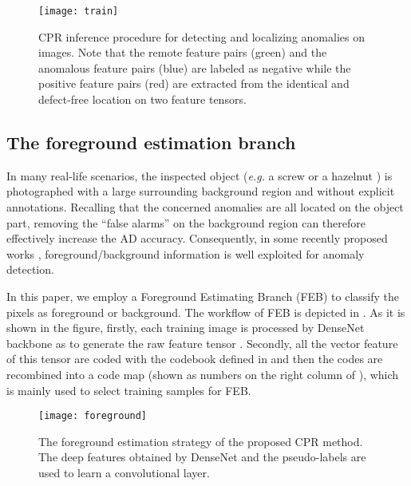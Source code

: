 \documentclass[lettersize,journal]{IEEEtran}
\begin{document}
\begin{figure*}[htbp]
  \centering
  \texttt{[image: train]}
  \caption{
    CPR inference procedure for detecting and localizing anomalies on images. Note that
    the remote feature pairs (green) and the anomalous feature pairs (blue) are labeled as
    negative while the positive feature pairs (red) are extracted from the identical and
    defect-free location on two feature tensors.}
  \label{fig:train}
\end{figure*}

\subsection{The foreground estimation branch}
\label{subsec:foreground}
In many real-life scenarios, the inspected object (\emph{e.g.} a screw or a hazelnut
\cite{bergmann2019mvtec}) is photographed with a large surrounding background region and
without explicit annotations. Recalling that the concerned anomalies are all located on the
object part, removing the ``false alarms'' on the background region can therefore
effectively increase the AD accuracy. Consequently, in some recently proposed works
\cite{yang2023memseg, zhang2022prototypical, wang2023multimodal, yao2022explicit},
foreground/background information is well exploited for anomaly detection.

In this paper, we employ a Foreground Estimating Branch (FEB) to classify
the pixels as foreground or background. The workflow of FEB is depicted in
. As it is shown in the figure, firstly, each training image
 is processed by DenseNet backbone as  to
generate the raw feature tensor . Secondly, all the vector feature  of this tensor are coded with the codebook
 defined in  and then the codes are recombined
into a code map  (shown as numbers on the right column of ), which is mainly used to select training samples for FEB.

\begin{figure}[htbp]
  \centering
  \texttt{[image: foreground]}
  \caption{The foreground estimation strategy of the proposed CPR method. The deep
    features obtained by DenseNet and the pseudo-labels are used to learn a  convolutional layer.}
  \label{fig:foreground}
\end{figure}
\end{document}
